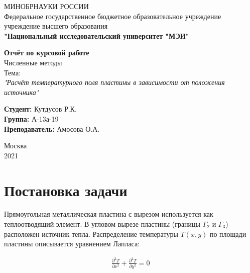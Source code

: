 \documentclass[a4paper, 12pt]{article} %
\begin{document}
\thispagestyle{empty}

\begin{center}
\Large{МИНОБРНАУКИ РОССИИ} \\
\large{Федеральное государственное бюджетное образовательное учреждение}\\
\large{учреждение высшего образования}\\
\large{\textbf{"Национальный исследовательский университет "МЭИ"}}\\
\hfill \break
\hfill \break

\Large{\textbf{Отчёт по курсовой работе}} \\
\Large{Численные методы} \\
\large{Тема:} \\
\large{\textit{"Расчёт температурного поля пластины в зависимости от положения источника"}} \\
\hfill \break
\hfill \break
\hfill \break
\hfill \break
\begin{flushright}
\large{\textbf{Студент:} Кутдусов Р.К.} \\
\large{\textbf{Группа:} А-13а-19} \\
\large{\textbf{Преподаватель:} Амосова О.А.} \\
\end{flushright}

\hfill \break
\hfill \break
\hfill \break
\hfill \break
\hfill \break
\hfill \break
\hfill \break
\hfill \break
\hfill \break
\hfill \break
\hfill \break
\hfill \break
\hfill \break
\hfill \break
\hfill \break
\hfill \break
\hfill \break
\hfill \break

\normalsize{Москва} \\
\normalsize{2021}


\end{center}

\newpage

\tableofcontents

\newpage


\section{Постановка задачи}

Прямоугольная металлическая пластина с вырезом используется как теплоотводящий элемент. В угловом вырезе пластины (границы $ \Gamma_2  $ и $ \Gamma_3 $) расположен источник тепла. Распределение температуры $ T(x,y) $ по площади пластины описывается уравнением Лапласа:

\begin{equation} 
\begin{gathered} \frac{\partial^2 T}{\partial x^2} + \frac{\partial^2 T}{\partial y^2} = 0 
\end{gathered} 
\end{equation}
\end{document}
